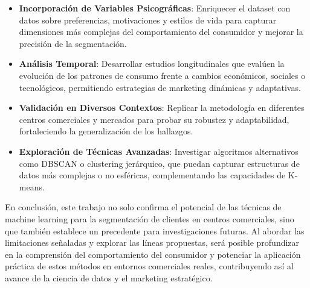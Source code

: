 \documentclass[10pt]{article}
\begin{document}
\begin{itemize}
    \item \textbf{Incorporaci\'on de Variables Psicogr\'aficas}: Enriquecer el dataset con datos sobre preferencias, motivaciones y estilos de vida para capturar dimensiones m\'as complejas del comportamiento del consumidor y mejorar la precisi\'on de la segmentaci\'on.
    \item \textbf{An\'alisis Temporal}: Desarrollar estudios longitudinales que eval\'uen la evoluci\'on de los patrones de consumo frente a cambios econ\'omicos, sociales o tecnol\'ogicos, permitiendo estrategias de marketing din\'amicas y adaptativas.
    \item \textbf{Validaci\'on en Diversos Contextos}: Replicar la metodolog\'ia en diferentes centros comerciales y mercados para probar su robustez y adaptabilidad, fortaleciendo la generalizaci\'on de los hallazgos.
    \item \textbf{Exploraci\'on de T\'ecnicas Avanzadas}: Investigar algoritmos alternativos como DBSCAN o clustering jer\'arquico, que puedan capturar estructuras de datos m\'as complejas o no esf\'ericas, complementando las capacidades de K-means.
\end{itemize}

En conclusi\'on, este trabajo no solo confirma el potencial de las t\'ecnicas de machine learning para la segmentaci\'on de clientes en centros comerciales, sino que tambi\'en establece un precedente para investigaciones futuras. Al abordar las limitaciones se\~naladas y explorar las l\'ineas propuestas, ser\'a posible profundizar en la comprensi\'on del comportamiento del consumidor y potenciar la aplicaci\'on pr\'actica de estos m\'etodos en entornos comerciales reales, contribuyendo as\'i al avance de la ciencia de datos y el marketing estrat\'egico.
\end{document}
